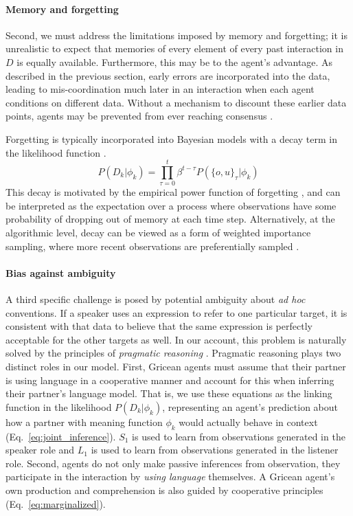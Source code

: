 \paragraph{Memory and forgetting}

Second, we must address the limitations imposed by memory and forgetting; it is unrealistic to expect that memories of every element of every past interaction in $D$ is equally available.
Furthermore, this may be to the agent's advantage. 
As described in the previous section, early errors are incorporated into the data, leading to mis-coordination much later in an interaction when each agent conditions on different data.
Without a mechanism to discount these earlier data points, agents may be prevented from ever reaching consensus \cite{spike_minimal_2017}.

Forgetting is typically incorporated into Bayesian models with a decay term in the likelihood function \cite{anderson2000adaptive,angela2009sequential,fudenberg2014recency,kalm2018visual}.
$$P(D_k | \phi_k) = \prod_{\tau=0}^t \beta^{t-\tau} P(\{o,u\}_\tau | \phi_k)$$
This decay is motivated by the empirical power function of forgetting \cite{wixted1991form}, and can be interpreted as the expectation over a process where observations have some probability of dropping out of memory at each time step.
Alternatively, at the algorithmic level, decay can be viewed as a form of weighted importance sampling, where more recent observations are preferentially sampled \cite{pearl2010online}.

\paragraph{Bias against ambiguity}

A third specific challenge is posed by potential ambiguity about \emph{ad hoc} conventions.
If a speaker uses an expression to refer to one particular target, it is consistent with that data to believe that the same expression is perfectly acceptable for the other targets as well. 
In our account, this problem is naturally solved by the principles of \textit{pragmatic reasoning} \cite{Grice75_LogicConversation}.
Pragmatic reasoning plays two distinct roles in our model.
First, Gricean agents must assume that their partner is using language in a cooperative manner and account for this when inferring their partner's language model.
That is, we use these equations as the linking function in the likelihood $P(D_k | \phi_k)$, representing an agent's prediction about how a partner with meaning function $\phi_k$ would actually behave in context (Eq.~\ref{eq:joint_inference}). 
$S_1$ is used to learn from observations generated in the speaker role and $L_1$ is used to learn from observations generated in the listener role.
Second, agents do not only make passive inferences from observation, they participate in the interaction by \emph{using language} themselves.
A Gricean agent's own production and comprehension is also guided by cooperative principles (Eq.~\ref{eq:marginalized}).

